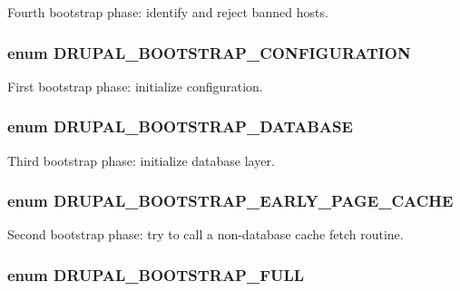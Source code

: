 Fourth bootstrap phase: identify and reject banned hosts. \hypertarget{bootstrap_8inc_d71394314c3ad7cef54b5f566e3ec177}{
\subsubsection[{DRUPAL\_\-BOOTSTRAP\_\-CONFIGURATION}]{\setlength{\rightskip}{0pt plus 5cm}enum {\bf DRUPAL\_\-BOOTSTRAP\_\-CONFIGURATION}}}
\label{bootstrap_8inc_d71394314c3ad7cef54b5f566e3ec177}


First bootstrap phase: initialize configuration. \hypertarget{bootstrap_8inc_693d842eaaf448b1e6c37cc4ef068e3a}{
\subsubsection[{DRUPAL\_\-BOOTSTRAP\_\-DATABASE}]{\setlength{\rightskip}{0pt plus 5cm}enum {\bf DRUPAL\_\-BOOTSTRAP\_\-DATABASE}}}
\label{bootstrap_8inc_693d842eaaf448b1e6c37cc4ef068e3a}


Third bootstrap phase: initialize database layer. \hypertarget{bootstrap_8inc_2a31f7dd5f742243b66f16c9d3237407}{
\subsubsection[{DRUPAL\_\-BOOTSTRAP\_\-EARLY\_\-PAGE\_\-CACHE}]{\setlength{\rightskip}{0pt plus 5cm}enum {\bf DRUPAL\_\-BOOTSTRAP\_\-EARLY\_\-PAGE\_\-CACHE}}}
\label{bootstrap_8inc_2a31f7dd5f742243b66f16c9d3237407}


Second bootstrap phase: try to call a non-database cache fetch routine. \hypertarget{bootstrap_8inc_2c8ac509af1924cf2fa7420a22e1b048}{
\subsubsection[{DRUPAL\_\-BOOTSTRAP\_\-FULL}]{\setlength{\rightskip}{0pt plus 5cm}enum {\bf DRUPAL\_\-BOOTSTRAP\_\-FULL}}}
\label{bootstrap_8inc_2c8ac509af1924cf2fa7420a22e1b048}


